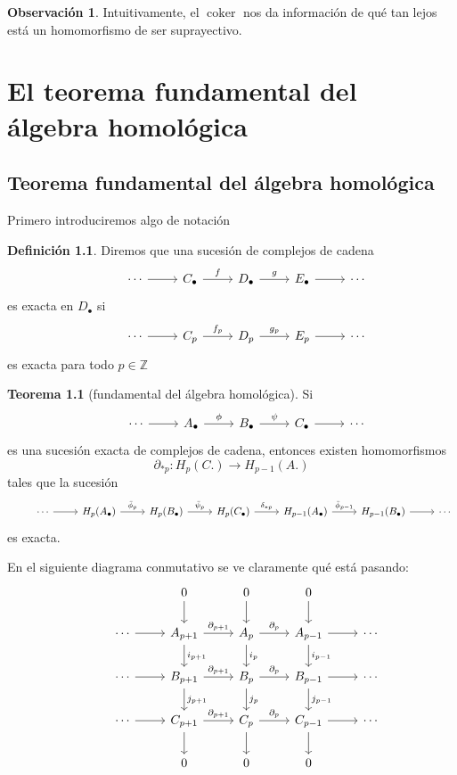 \documentclass{book}
\theoremstyle{definition}
\newtheorem*{defn}{Definición}
\newtheorem*{obs}{Observación}
\newtheorem*{teo}{Teorema}
\newcommand{\Z}{\mathbb{Z}}
\DeclareMathOperator{\coker}{coker}
\begin{document}
	\begin{obs}
		Intuitivamente, el $\coker$ nos da información de qué tan lejos está un homomorfismo de ser suprayectivo.
	\end{obs}
\chapter{El teorema fundamental del álgebra homológica}
\section{Teorema fundamental del álgebra homológica}
	Primero introduciremos algo de notación
	\begin{defn}
		Diremos que una sucesión de complejos de cadena
		\[\begin{tikzcd}
			&\cdots\arrow{r}&C_\bullet\arrow{r}{f}&D_\bullet\arrow{r}{g}&E_\bullet\arrow{r}&\cdots
		\end{tikzcd}\]
		es exacta en $D_\bullet$ si 
		\[\begin{tikzcd}
			&\cdots\arrow{r}&C_p\arrow{r}{f_p}&D_p\arrow{r}{g_p}&E_p\arrow{r}&\cdots
		\end{tikzcd}\]
		es exacta para todo $p\in\Z$
	\end{defn}
	\begin{teo}[fundamental del álgebra homológica]
		Si 
		\[\begin{tikzcd}
			&\cdots\arrow{r}&A_\bullet\arrow{r}{\phi}&B_\bullet\arrow{r}{\psi}&C_\bullet\arrow{r}&\cdots
		\end{tikzcd}\]
		es una sucesión exacta de complejos de cadena, entonces existen homomorfismos $$\partial_{*p}:H_p(C.)\to H_{p-1}(A.)$$
		tales que la sucesión
		\[\begin{tikzcd}
			&\cdots\arrow{r}&H_p(A_\bullet)\arrow{r}{\bar\phi_p}&H_p(B_\bullet)\arrow{r}{\bar\psi_p}&H_p(C_\bullet)\arrow{r}{\delta_{*p}}&H_{p-1}(A_\bullet)\arrow{r}{\bar\phi_{p-1}}&H_{p-1}(B_\bullet)\arrow{r}&\cdots
		\end{tikzcd}\]
		es exacta.
	\end{teo}
	En el siguiente diagrama conmutativo se ve claramente qué está pasando:
	\[
	\begin{tikzcd}
		& & 0 \arrow{d} & 0 \arrow{d} & 0 \arrow{d} & \\
		& \cdots \arrow{r} & A_{p+1} \arrow{r}{\partial_{p+1}} \arrow{d}{i_{p+1}} & A_p \arrow{r}{\partial_p} \arrow{d}{i_p} & A_{p-1} \arrow{r} \arrow{d}{i_{p-1}} & \cdots \\
		& \cdots \arrow{r} & B_{p+1} \arrow{r}{\partial_{p+1}} \arrow{d}{j_{p+1}} & B_p \arrow{r}{\partial_p} \arrow{d}{j_p} & B_{p-1} \arrow{r} \arrow{d}{j_{p-1}} & \cdots \\
		& \cdots \arrow{r} & C_{p+1} \arrow{r}{\partial_{p+1}} \arrow{d} & C_p \arrow{r}{\partial_p} \arrow{d} & C_{p-1} \arrow{r} \arrow{d} & \cdots \\
		& & 0 & 0 & 0 & \\
	\end{tikzcd}
	\]
\end{document}
